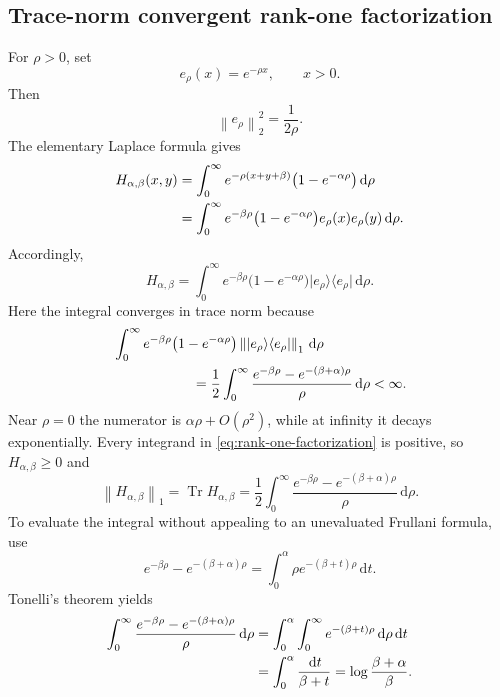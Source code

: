 \documentclass[11pt]{article}
\theoremstyle{accent}
\theoremstyle{definition}
\newcommand{\Tr}{\operatorname{Tr}}
\newcommand{\dd}{\,\mathrm{d}}
\newcommand{\norm}[1]{\left\lVert #1\right\rVert}
\begin{document}
\subsection{Trace-norm convergent rank-one factorization}

For \(\rho>0\), set
\[
 e_\rho(x)=e^{-\rho x},\qquad x>0.
\]
Then
\begin{equation}\label{eq:e-rho-norm}
 \norm{e_\rho}_2^2=\frac1{2\rho}.
\end{equation}
The elementary Laplace formula gives
\begin{align}
 H_{\alpha,\beta}(x,y)
 &=\int_0^\infty
 e^{-\rho(x+y+\beta)}
 \bigl(1-e^{-\alpha\rho}\bigr)\dd\rho\notag\\
 &=\int_0^\infty
 e^{-\beta\rho}\bigl(1-e^{-\alpha\rho}\bigr)
 e_\rho(x)e_\rho(y)\dd\rho.
 \label{eq:laplace-kernel}
\end{align}
Accordingly,
\begin{equation}\label{eq:rank-one-factorization}
 \boxed{
 H_{\alpha,\beta}
 =\int_0^\infty
 e^{-\beta\rho}\bigl(1-e^{-\alpha\rho}\bigr)
 \lvert e_\rho\rangle\langle e_\rho\rvert\dd\rho.
 }
\end{equation}
Here the integral converges in trace norm because
\begin{align}
 &\int_0^\infty e^{-\beta\rho}
 \bigl(1-e^{-\alpha\rho}\bigr)
 \norm{\lvert e_\rho\rangle\langle e_\rho\rvert}_1\dd\rho\notag\\
 &\hspace{2cm}
 =\frac12\int_0^\infty
 \frac{e^{-\beta\rho}-e^{-(\beta+\alpha)\rho}}{\rho}\dd\rho<\infty.
 \label{eq:trace-integrability}
\end{align}
Near \(\rho=0\) the numerator is \(\alpha\rho+O(\rho^2)\), while at infinity it decays exponentially.  Every integrand in \eqref{eq:rank-one-factorization} is positive, so \(H_{\alpha,\beta}\ge0\) and
\begin{equation}\label{eq:trace-H}
 \norm{H_{\alpha,\beta}}_1
 =\Tr H_{\alpha,\beta}
 =\frac12\int_0^\infty
 \frac{e^{-\beta\rho}-e^{-(\beta+\alpha)\rho}}{\rho}\dd\rho.
\end{equation}
To evaluate the integral without appealing to an unevaluated Frullani formula, use
\[
 e^{-\beta\rho}-e^{-(\beta+\alpha)\rho}
 =\int_0^\alpha \rho e^{-(\beta+t)\rho}\dd t.
\]
Tonelli's theorem yields
\begin{align}
 \int_0^\infty
 \frac{e^{-\beta\rho}-e^{-(\beta+\alpha)\rho}}{\rho}\dd\rho
 &=\int_0^\alpha\int_0^\infty e^{-(\beta+t)\rho}\dd\rho\dd t\notag\\
 &=\int_0^\alpha\frac{\dd t}{\beta+t}
 =\log\frac{\beta+\alpha}{\beta}.
 \label{eq:frullani-eval}
\end{align}
\end{document}
